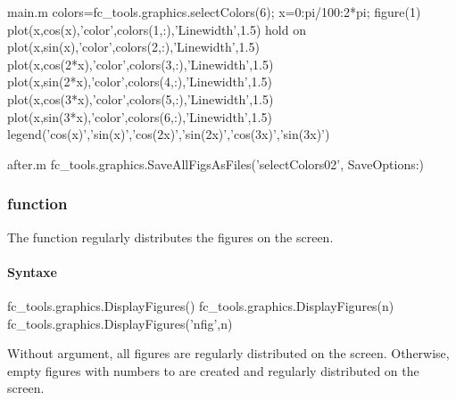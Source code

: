 \begin{filecontents*}{main.m}
colors=fc_tools.graphics.selectColors(6);
x=0:pi/100:2*pi;
figure(1)
plot(x,cos(x),'color',colors(1,:),'Linewidth',1.5)
hold on
plot(x,sin(x),'color',colors(2,:),'Linewidth',1.5)
plot(x,cos(2*x),'color',colors(3,:),'Linewidth',1.5)
plot(x,sin(2*x),'color',colors(4,:),'Linewidth',1.5)
plot(x,cos(3*x),'color',colors(5,:),'Linewidth',1.5)
plot(x,sin(3*x),'color',colors(6,:),'Linewidth',1.5)
legend('cos(x)','sin(x)','cos(2x)','sin(2x)','cos(3x)','sin(3x)')
\end{filecontents*}
\begin{filecontents*}{after.m}
fc_tools.graphics.SaveAllFigsAsFiles('selectColors02', SaveOptions{:})
\end{filecontents*}

\begin{center}
\end{center}




\subsubsection[fc\_tools.graphics.DisplayFigures function]{ function}
The  function regularly distributes the figures on the screen.
\paragraph{Syntaxe}
\begin{syntaxe}
fc_tools.graphics.DisplayFigures()
fc_tools.graphics.DisplayFigures(n)
fc_tools.graphics.DisplayFigures('nfig',n)
\end{syntaxe}
Without argument, all figures are regularly distributed on the screen.
Otherwise, empty figures with numbers  to  are created and regularly distributed on the screen.


